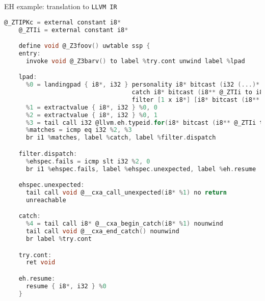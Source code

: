 \documentclass[8pt]{beamer}
\begin{document}
\begin{frame}[fragile]{EH example: translation to \texttt{LLVM IR}}
  \begin{lstlisting}[language=C,basicstyle=\tiny\ttfamily]
    @_ZTIPKc = external constant i8*
    @_ZTIi = external constant i8*

    define void @_Z3foov() uwtable ssp {
    entry:
      invoke void @_Z3barv() to label %try.cont unwind label %lpad

    lpad:
      %0 = landingpad { i8*, i32 } personality i8* bitcast (i32 (...)* @__gxx_personality_v0 to i8*)
                                   catch i8* bitcast (i8** @_ZTIi to i8*)
                                   filter [1 x i8*] [i8* bitcast (i8** @_ZTIPKc to i8*)]
      %1 = extractvalue { i8*, i32 } %0, 0
      %2 = extractvalue { i8*, i32 } %0, 1
      %3 = tail call i32 @llvm.eh.typeid.for(i8* bitcast (i8** @_ZTIi to i8*)) nounwind
      %matches = icmp eq i32 %2, %3
      br i1 %matches, label %catch, label %filter.dispatch

    filter.dispatch:
      %ehspec.fails = icmp slt i32 %2, 0
      br i1 %ehspec.fails, label %ehspec.unexpected, label %eh.resume

    ehspec.unexpected:
      tail call void @__cxa_call_unexpected(i8* %1) no return
      unreachable

    catch:
      %4 = tail call i8* @__cxa_begin_catch(i8* %1) nounwind
      tail call void @__cxa_end_catch() nounwind
      br label %try.cont

    try.cont:
      ret void

    eh.resume:
      resume { i8*, i32 } %0
    }
  \end{lstlisting}
\end{frame}
\end{document}
